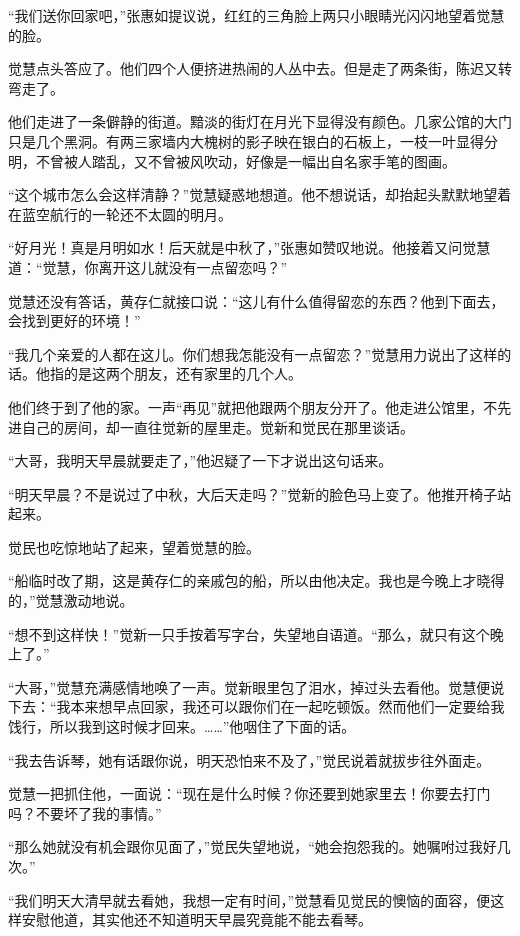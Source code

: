 \par “我们送你回家吧，”张惠如提议说，红红的三角脸上两只小眼睛光闪闪地望着觉慧的脸。
\par 觉慧点头答应了。他们四个人便挤进热闹的人丛中去。但是走了两条街，陈迟又转弯走了。
\par 他们走进了一条僻静的街道。黯淡的街灯在月光下显得没有颜色。几家公馆的大门只是几个黑洞。有两三家墙内大槐树的影子映在银白的石板上，一枝一叶显得分明，不曾被人踏乱，又不曾被风吹动，好像是一幅出自名家手笔的图画。
\par “这个城市怎么会这样清静？”觉慧疑惑地想道。他不想说话，却抬起头默默地望着在蓝空航行的一轮还不太圆的明月。
\par “好月光！真是月明如水！后天就是中秋了，”张惠如赞叹地说。他接着又问觉慧道：“觉慧，你离开这儿就没有一点留恋吗？”
\par 觉慧还没有答话，黄存仁就接口说：“这儿有什么值得留恋的东西？他到下面去，会找到更好的环境！”
\par “我几个亲爱的人都在这儿。你们想我怎能没有一点留恋？”觉慧用力说出了这样的话。他指的是这两个朋友，还有家里的几个人。
\par 他们终于到了他的家。一声“再见”就把他跟两个朋友分开了。他走进公馆里，不先进自己的房间，却一直往觉新的屋里走。觉新和觉民在那里谈话。
\par “大哥，我明天早晨就要走了，”他迟疑了一下才说出这句话来。
\par “明天早晨？不是说过了中秋，大后天走吗？”觉新的脸色马上变了。他推开椅子站起来。
\par 觉民也吃惊地站了起来，望着觉慧的脸。
\par “船临时改了期，这是黄存仁的亲戚包的船，所以由他决定。我也是今晚上才晓得的，”觉慧激动地说。
\par “想不到这样快！”觉新一只手按着写字台，失望地自语道。“那么，就只有这个晚上了。”
\par “大哥，”觉慧充满感情地唤了一声。觉新眼里包了泪水，掉过头去看他。觉慧便说下去：“我本来想早点回家，我还可以跟你们在一起吃顿饭。然而他们一定要给我饯行，所以我到这时候才回来。……”他咽住了下面的话。
\par “我去告诉琴，她有话跟你说，明天恐怕来不及了，”觉民说着就拔步往外面走。
\par 觉慧一把抓住他，一面说：“现在是什么时候？你还要到她家里去！你要去打门吗？不要坏了我的事情。”
\par “那么她就没有机会跟你见面了，”觉民失望地说，“她会抱怨我的。她嘱咐过我好几次。”
\par “我们明天大清早就去看她，我想一定有时间，”觉慧看见觉民的懊恼的面容，便这样安慰他道，其实他还不知道明天早晨究竟能不能去看琴。

